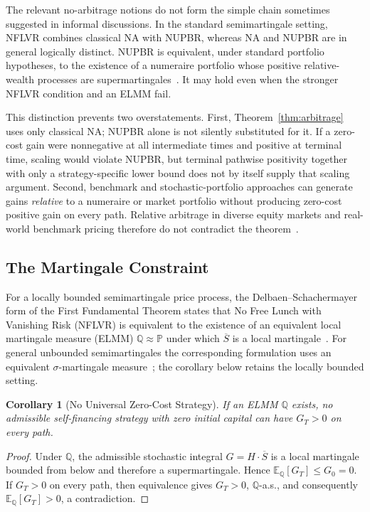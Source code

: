 \documentclass[aps,pra,reprint,superscriptaddress,amsmath,amssymb,floatfix]{revtex4-2}
\theoremstyle{plain}
\newtheorem{corollary}[theorem]{Corollary}
\theoremstyle{definition}
\theoremstyle{remark}
\begin{document}
The relevant no-arbitrage notions do not form the simple chain sometimes
suggested in informal discussions. In the standard semimartingale setting,
NFLVR combines classical NA with NUPBR, whereas NA and NUPBR are in general
logically distinct. NUPBR is equivalent, under standard portfolio hypotheses,
to the existence of a numeraire portfolio whose positive relative-wealth
processes are supermartingales~\cite{KaratzasKardaras2007,Kardaras2012}.
It may hold even when the stronger NFLVR condition and an ELMM fail.

This distinction prevents two overstatements. First, Theorem~\ref{thm:arbitrage}
uses only classical NA; NUPBR alone is not silently substituted for it. If a
zero-cost gain were nonnegative at all intermediate times and positive at
terminal time, scaling would violate NUPBR, but terminal pathwise positivity
together with only a strategy-specific lower bound does not by itself supply
that scaling argument. Second, benchmark and stochastic-portfolio approaches
can generate gains \emph{relative} to a numeraire or market portfolio without
producing zero-cost positive gain on every path. Relative arbitrage in diverse
equity markets and real-world benchmark pricing therefore do not contradict
the theorem~\cite{FernholzKaratzasKardaras2005,PlatenHeath2010}.

\subsection{The Martingale Constraint}

For a locally bounded semimartingale price process, the
Delbaen--Schachermayer form of the First Fundamental Theorem states that No
Free Lunch with Vanishing Risk (NFLVR) is equivalent to the existence of an
equivalent local martingale measure (ELMM)
\(\mathbb{Q}\approx\mathbb{P}\) under which \(\overline S\) is a local
martingale~\cite{Harrison1981,Delbaen1994}. For general unbounded
semimartingales the corresponding formulation uses an equivalent
\(\sigma\)-martingale measure~\cite{DelbaenSchachermayer1998}; the corollary below
retains the locally bounded setting.

\begin{corollary}[No Universal Zero-Cost Strategy]
  \label{cor:noarb}
  If an ELMM \(\mathbb{Q}\) exists, no admissible self-financing strategy with
  zero initial capital can have \(G_T>0\) on every path.
\end{corollary}

\begin{proof}
Under \(\mathbb{Q}\), the admissible stochastic integral
\(G=H\mathbin{\cdot}\overline S\) is a local martingale bounded from below and
therefore a supermartingale. Hence
\(\mathbb{E}_{\mathbb{Q}}[G_T]\leq G_0=0\). If \(G_T>0\) on every path, then
equivalence gives \(G_T>0\), \(\mathbb{Q}\)-a.s., and consequently
\(\mathbb{E}_{\mathbb{Q}}[G_T]>0\), a contradiction.
\end{proof}
\end{document}
